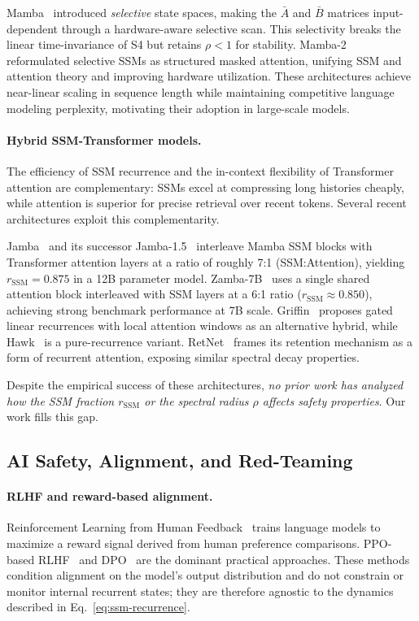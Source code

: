 \documentclass{article}
\newcommand{\rSSM}{r_{\mathrm{SSM}}}
\begin{document}
Mamba~\cite{gu2023mamba} introduced \emph{selective} state spaces, making the
$\bar{A}$ and $\bar{B}$ matrices input-dependent through a hardware-aware
selective scan.  This selectivity breaks the linear time-invariance of S4 but
retains $\rho < 1$ for stability.  Mamba-2~\cite{dao2024mamba2} reformulated
selective SSMs as structured masked attention, unifying SSM and attention theory
and improving hardware utilization.  These architectures achieve near-linear
scaling in sequence length while maintaining competitive language modeling
perplexity, motivating their adoption in large-scale models.

\paragraph{Hybrid SSM-Transformer models.}
The efficiency of SSM recurrence and the in-context flexibility of Transformer
attention are complementary: SSMs excel at compressing long histories cheaply,
while attention is superior for precise retrieval over recent tokens.  Several
recent architectures exploit this complementarity.

Jamba~\cite{lieber2024jamba} and its successor Jamba-1.5~\cite{lieber2024jamba15}
interleave Mamba SSM blocks with Transformer attention layers at a ratio of
roughly 7:1 (SSM:Attention), yielding $\rSSM = 0.875$ in a 12B parameter model.
Zamba-7B~\cite{glorioso2024zamba} uses a single shared attention block
interleaved with SSM layers at a 6:1 ratio ($\rSSM \approx 0.850$), achieving
strong benchmark performance at 7B scale.  Griffin~\cite{de2024griffin}
proposes gated linear recurrences with local attention windows as an alternative
hybrid, while Hawk~\cite{de2024griffin} is a pure-recurrence variant.
RetNet~\cite{sun2023retentive} frames its retention mechanism as a form of
recurrent attention, exposing similar spectral decay properties.

Despite the empirical success of these architectures, \emph{no prior work has
analyzed how the SSM fraction $\rSSM$ or the spectral radius $\rho$ affects
safety properties}.  Our work fills this gap.

\subsection{AI Safety, Alignment, and Red-Teaming}

\paragraph{RLHF and reward-based alignment.}
Reinforcement Learning from Human Feedback~\cite{ouyang2022training,bai2022training}
trains language models to maximize a reward signal derived from human
preference comparisons.  PPO-based RLHF~\cite{schulman2017proximal} and
DPO~\cite{rafailov2023direct} are the dominant practical approaches.  These
methods condition alignment on the model's output distribution and do not
constrain or monitor internal recurrent states; they are therefore agnostic to
the dynamics described in Eq.~\eqref{eq:ssm-recurrence}.
\end{document}

